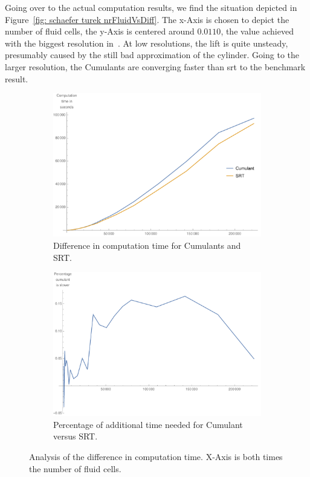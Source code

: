 Going over to the actual computation results, we find the situation depicted in Figure~\ref{fig: schaefer turek nrFluidVsDiff}.
The x-Axis is chosen to depict the number of fluid cells, the y-Axis is centered around $0.0110$, the value achieved with the biggest resolution in~\cite{schafer1996benchmark}.
At low resolutions, the lift is quite unsteady, presumably caused by the still bad approximation of the cylinder.
Going to the larger resolution, the Cumulants are converging faster than \gls{srt} to the benchmark result.

\begin{figure}
\centering
\begin{subfigure}{.48\textwidth}
  \centering
  \includegraphics[width=\linewidth]{../figures/schaeferTurekLift_domainVsTime.pdf} %
  \caption{Difference in computation time for Cumulants and SRT.}
\label{fig: schaefer turek domain vs time}
\end{subfigure}\hfill
\begin{subfigure}{.48\textwidth}
  \centering
  \includegraphics[width=\linewidth]{../figures/schaeferTurekLift_performanceGap.pdf} %
  \caption{Percentage of additional time needed for Cumulant versus SRT.}
\label{fig: schaefer turek time percentage}
\end{subfigure}
\caption{Analysis of the difference in computation time. X-Axis is both times the number of fluid cells.}
\label{fig: time analysis cumulant vs SRT}
\end{figure}

